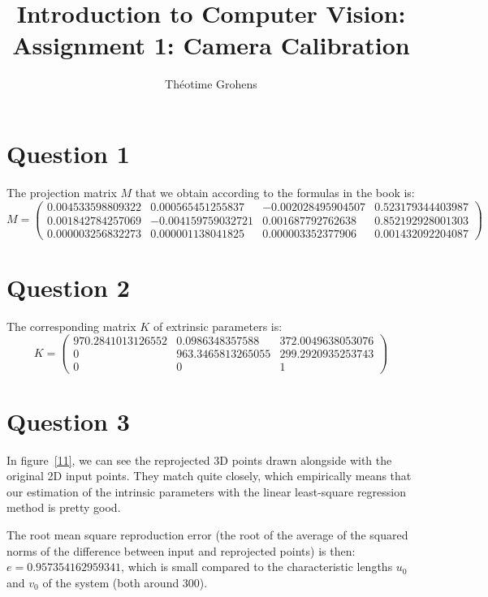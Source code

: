 \documentclass[a4paper]{article}
\author{Théotime Grohens}
\title{Introduction to Computer Vision: \\ Assignment 1: Camera Calibration}
\begin{document}
\maketitle

\section*{Question 1}

The projection matrix $M$ that we obtain according to the formulas in the book is:
$$ M =
\begin{pmatrix}
0.004533598809322 & 0.000565451255837 & -0.002028495904507 & 0.523179344403987 \\
0.001842784257069 & -0.004159759032721 & 0.001687792762638 & 0.852192928001303 \\
0.000003256832273 & 0.000001138041825 & 0.000003352377906 & 0.001432092204087
\end{pmatrix}
$$

\section*{Question 2}

The corresponding matrix $K$ of extrinsic parameters is:
$$ K =
\begin{pmatrix}
970.2841013126552  & 0.0986348357588  & 372.0049638053076 \\
                   0   &963.3465813265055  & 299.2920935253743 \\
                   0           &        0 &  1
\end{pmatrix}
$$

\section*{Question 3}

In figure~\ref{11}, we can see the reprojected 3D points drawn alongside with the original 2D input points.
They match quite closely, which empirically means that our estimation of the intrinsic parameters with the linear least-square regression method is pretty good.

The root mean square reproduction error (the root of the average of the squared norms of the difference between input and reprojected points) is then: $e = 0.957354162959341$, which is small compared to the characteristic lengths $u_0$ and $v_0$ of the system (both around 300).
\end{document}
